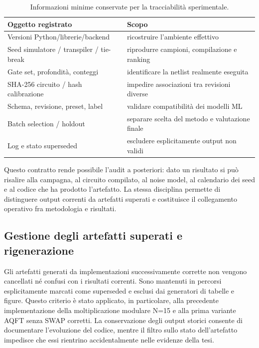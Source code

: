 \begingroup
\small
\begin{table}[!htbp]
\centering
\small

\begin{tabular}{@{}
  >{\raggedright\arraybackslash}p{}
  >{\raggedright\arraybackslash}p{}@{}}
\toprule
\textbf{Oggetto registrato} & \textbf{Scopo} \\
\midrule
Versioni Python/\allowbreak{}librerie/\allowbreak{}backend & ricostruire l'ambiente effettivo \\
\addlinespace[0.3em]
Seed simulatore / transpiler / tie-break & riprodurre campioni, compilazione e ranking \\
\addlinespace[0.3em]
Gate set, profondità, conteggi & identificare la netlist realmente eseguita \\
\addlinespace[0.3em]
SHA-256 circuito / hash calibrazione & impedire associazioni tra revisioni diverse \\
\addlinespace[0.3em]
Schema, revisione, preset, label & validare compatibilità dei modelli ML \\
\addlinespace[0.3em]
Batch selection / holdout & separare scelta del metodo e valutazione finale \\
\addlinespace[0.3em]
Log e stato superseded & escludere esplicitamente output non validi \\
\bottomrule
\end{tabular}
\caption{Informazioni minime conservate per la tracciabilità sperimentale.}\label{tab:finale_4_5}

\end{table}
\endgroup

Questo contratto rende possibile l'audit a posteriori: dato un risultato si può risalire alla campagna, al circuito compilato, al noise model, al calendario dei seed e al codice che ha prodotto l'artefatto. La stessa disciplina permette di distinguere output correnti da artefatti superati e costituisce il collegamento operativo fra metodologia e risultati.

\subsection{Gestione degli artefatti superati e rigenerazione}\label{sec:finale_4_8_1}

Gli artefatti generati da implementazioni successivamente corrette non vengono cancellati né confusi con i risultati correnti. Sono mantenuti in percorsi esplicitamente marcati come superseded e esclusi dai generatori di tabelle e figure. Questo criterio è stato applicato, in particolare, alla precedente implementazione della moltiplicazione modulare N=15 e alla prima variante AQFT senza SWAP corretti. La conservazione degli output storici consente di documentare l'evoluzione del codice, mentre il filtro sullo stato dell'artefatto impedisce che essi rientrino accidentalmente nelle evidenze della tesi.

